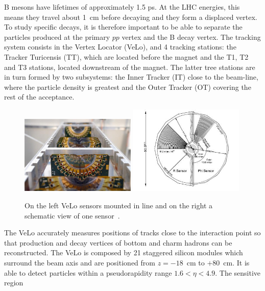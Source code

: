 B mesons have lifetimes of approximately 1.5 ps. At the LHC energies, this means they travel about
1~cm before decaying and they form a displaced vertex. To study specific decays, it is therefore important
to be able to separate the particles produced at the primary $pp$ vertex and the B decay vertex.
The tracking system consists in the Vertex Locator (VeLo), and 4 tracking stations:
the Tracker Turicensis (TT), which are located before the magnet and the T1, T2 and T3 stations,
located downstream of the magnet. The latter tree stations are in turn formed by two subsystems:
the Inner Tracker (IT) close to the beam-line, where the particle density is greatest and
the Outer Tracker (OT) covering the rest of the acceptance.
%
\begin{center}
\begin{figure}[h!]
\centering 
\includegraphics[width=0.49\textwidth]{Detector/figs/detector/VELO.png}
\includegraphics[width=0.49\textwidth]{Detector/figs/detector/VELO_scheme.png}
\caption{On the left VeLo sensors mounted in line and on the right a schematic view of one sensor~\cite{Alves:2008zz}.}
\label{VeLo}
\end{figure}
\end{center}
%
The VeLo accurately measures positions of tracks close to the interaction point so that production
and decay vertices of bottom and charm hadrons can be reconstructed. The VeLo is composed by 21 staggered
silicon modules which surround the beam axis and are positioned from $z = -18$~cm to $+80$~cm.
It is able to detect particles within a pseudorapidity range $1.6 < \eta < 4.9$. The sensitive region
